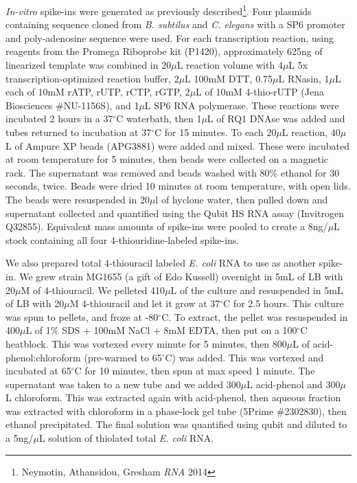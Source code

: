 {\emph{In-vitro} spike-ins were generated as previously
described\footnote{Neymotin, Athansidou, Gresham \emph{RNA} 2014}. Four
plasmids containing sequence cloned from \emph{B. subtilus} and \emph{C.
elegans} with a SP6 promoter and poly-adenosine sequence were used. For
each transcription reaction, using reagents from the Promega Riboprobe
kit (P1420), approximately 625ng of linearized template was combined in
20\(\mu\)L reaction volume with 4\(\mu\)L 5x transcription-optimized
reaction buffer, 2\(\mu\)L 100mM DTT, 0.75\(\mu\)L RNasin, 1\(\mu\)L
each of 10mM rATP, rUTP, rCTP, rGTP, 2\(\mu\)L of 10mM 4-thio-rUTP (Jena
Biosciences \#NU-1156S), and 1\(\mu\)L SP6 RNA polymerase. These
reactions were incubated 2 hours in a 37\(^{\circ}\)C waterbath, then
1\(\mu\)L of RQ1 DNAse was added and tubes returned to incubation at
37\(^{\circ}\)C for 15 minutes. To each 20\(\mu\)L reaction, 40\(\mu\)L
of Ampure XP beads (APG3881) were added and mixed. These were incubated
at room temperature for 5 minutes, then beads were collected on a
magnetic rack. The supernatant was removed and beads washed with 80\%
ethanol for 30 seconds, twice. Beads were dried 10 minutes at room
temperature, with open lids. The beads were resuspended in 20\(\mu\)l of
hyclone water, then pulled down and supernatant collected and quantified
using the Qubit HS RNA assay (Invitrogen Q32855). Equivalent mass
amounts of spike-ins were pooled to create a 8ng/\(\mu\)L stock
containing all four 4-thiouridine-labeled spike-ins.

We also prepared total 4-thiouracil labeled \emph{E. coli} RNA to use as
another spike-in. We grew strain MG1655 (a gift of Edo Kussell)
overnight in 5mL of LB with 20\(\mu\)M of 4-thiouracil. We pelleted
410\(\mu\)L of the culture and resuspended in 5mL of LB with 20\(\mu\)M
4-thiouracil and let it grow at 37\(^{\circ}\)C for 2.5 hours. This
culture was spun to pellets, and froze at -80\(^{\circ}\)C. To extract,
the pellet was resuspended in 400\(\mu\)L of 1\% SDS + 100mM NaCl + 8mM
EDTA, then put on a 100\(^{\circ}\)C heatblock. This was vortexed every
minute for 5 minutes, then 800\(\mu\)L of acid-phenol:chloroform
(pre-warmed to 65\(^{\circ}\)C) was added. This was vortexed and
incubated at 65\(^{\circ}\)C for 10 minutes, then spun at max speed 1
minute. The supernatant was taken to a new tube and we added 300\(\mu\)L
acid-phenol and 300\(\mu\)L chloroform. This was extracted again with
acid-phenol, then aqueous fraction was extracted with chloroform in a
phase-lock gel tube (5Prime \#2302830), then ethanol precipitated. The
final solution was quantified using qubit and diluted to a 5ng/\(\mu\)L
solution of thiolated total \emph{E. coli} RNA.

}
